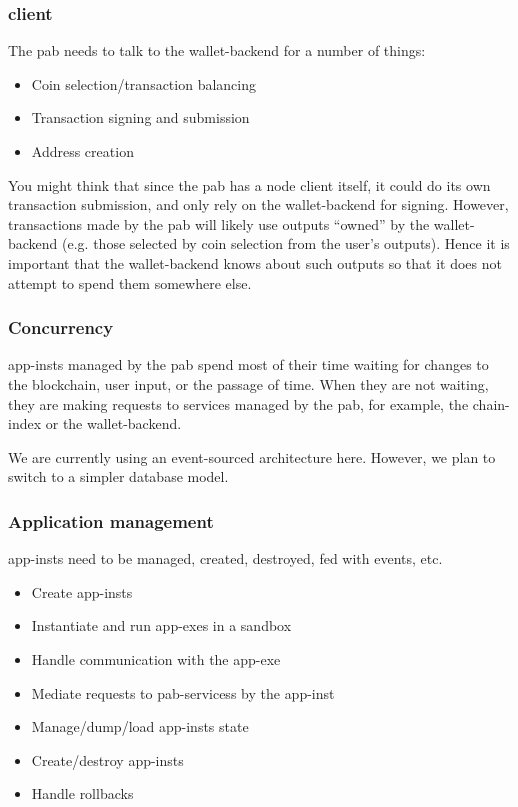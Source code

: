 \subsubsection{ client}

The \gls{pab} needs to talk to the \gls{wallet-backend} for a number of things:
\begin{itemize}
\item Coin selection/transaction balancing
\item Transaction signing and submission
\item Address creation
\end{itemize}

You might think that since the \gls{pab} has a node client itself, it could do its own transaction submission, and only rely on the \gls{wallet-backend} for signing.
However, transactions made by the \gls{pab} will likely use outputs ``owned'' by the \gls{wallet-backend} (e.g. those selected by coin selection from the user's outputs).
Hence it is important that the \gls{wallet-backend} knows about such outputs so that it does not attempt to spend them somewhere else.

\subsubsection{Concurrency}

\Glspl{app-inst} managed by the \gls{pab} spend most of their time waiting for changes to the blockchain, user input, or the passage of time.
When they are not waiting, they are making requests to services managed by the \gls{pab}, for example, the \gls{chain-index} or the \gls{wallet-backend}.


We are currently using an event-sourced architecture here.
However, we plan to switch to a simpler database model.

\subsubsection{Application management}

\Glspl{app-inst} need to be managed, created, destroyed, fed with events, etc.

\begin{itemize}
\item Create \glspl{app-inst}
\item Instantiate and run \glspl{app-exe} in a sandbox
\item Handle communication with the \gls{app-exe}
\item Mediate requests to \glspl{pab-services} by the \gls{app-inst}
\item Manage/dump/load \glspl{app-inst} state
\item Create/destroy \glspl{app-inst}
\item Handle rollbacks
\end{itemize}

